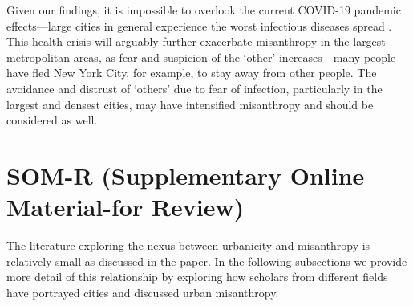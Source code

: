 \documentclass[11pt, letterpaper]{article}
\begin{document}
\begin{spacing}{1.4}
Given our findings, it is impossible to overlook the current COVID-19 pandemic effects---large cities in general experience the worst infectious diseases spread \citep{bettencourt10}. This health crisis will arguably further exacerbate misanthropy in the largest metropolitan areas, as fear and suspicion of the `other' increases---many people have fled New York City, for example, to stay away from other people. The avoidance and distrust of `others' due to fear of infection, particularly in the largest and densest cities, may have intensified misanthropy and should be considered as well. 







\clearpage

\section*{\LARGE SOM-R (Supplementary Online Material-for Review)}

The literature exploring the nexus between urbanicity and misanthropy is relatively small as discussed in the paper. In the following subsections we provide more detail of this relationship by exploring how scholars from different fields have portrayed cities and discussed urban misanthropy. 


\end{spacing}
\end{document}
